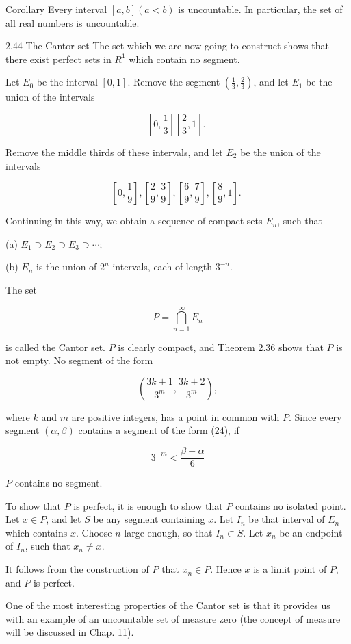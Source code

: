 \documentclass[10pt]{article}
\begin{document}
Corollary Every interval $[a, b](a<b)$ is uncountable. In particular, the set of all real numbers is uncountable.

2.44 The Cantor set The set which we are now going to construct shows that there exist perfect sets in $R^{1}$ which contain no segment.

Let $E_{0}$ be the interval $[0,1]$. Remove the segment $\left(\frac{1}{3}, \frac{2}{3}\right)$, and let $E_{1}$ be the union of the intervals

$$
\left[0, \frac{1}{3}\right]\left[\frac{2}{3}, 1\right] \text {. }
$$

Remove the middle thirds of these intervals, and let $E_{2}$ be the union of the intervals

$$
\left[0, \frac{1}{9}\right],\left[\frac{2}{9}, \frac{3}{9}\right],\left[\frac{6}{9}, \frac{7}{9}\right],\left[\frac{8}{9}, 1\right] \text {. }
$$

Continuing in this way, we obtain a sequence of compact sets $E_{n}$, such that

(a) $E_{1} \supset E_{2} \supset E_{3} \supset \cdots$;

(b) $E_{n}$ is the union of $2^{n}$ intervals, each of length $3^{-n}$.

The set

$$
P=\bigcap_{n=1}^{\infty} E_{n}
$$

is called the Cantor set. $P$ is clearly compact, and Theorem 2.36 shows that $P$ is not empty. No segment of the form

$$
\left(\frac{3 k+1}{3^{m}}, \frac{3 k+2}{3^{m}}\right),
$$

where $k$ and $m$ are positive integers, has a point in common with $P$. Since every segment $(\alpha, \beta)$ contains a segment of the form (24), if

$$
3^{-m}<\frac{\beta-\alpha}{6}
$$

$P$ contains no segment.

To show that $P$ is perfect, it is enough to show that $P$ contains no isolated point. Let $x \in P$, and let $S$ be any segment containing $x$. Let $I_{n}$ be that interval of $E_{n}$ which contains $x$. Choose $n$ large enough, so that $I_{n} \subset S$. Let $x_{n}$ be an endpoint of $I_{n}$, such that $x_{n} \neq x$.

It follows from the construction of $P$ that $x_{n} \in P$. Hence $x$ is a limit point of $P$, and $P$ is perfect.

One of the most interesting properties of the Cantor set is that it provides us with an example of an uncountable set of measure zero (the concept of measure will be discussed in Chap. 11).
\end{document}

